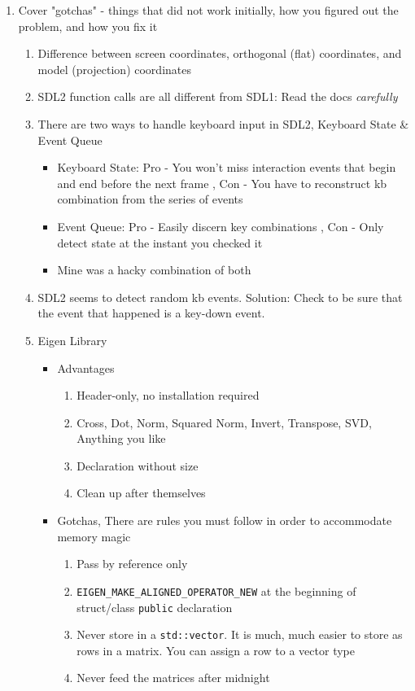 \documentclass{hw_grad}
\begin{document}
\begin{enumerate}
		\item Cover "gotchas" - things that did not work initially, how you figured out the problem, and how you fix it
		\begin{enumerate}
			\item Difference between screen coordinates, orthogonal (flat) coordinates, and model (projection) coordinates
			\item SDL2 function calls are all different from SDL1: Read the docs \textit{carefully}
			\item There are two ways to handle keyboard input in SDL2, Keyboard State \& Event Queue
			\begin{itemize}
				\item Keyboard State: Pro - You won't miss interaction events that begin and end before the next frame , Con - You have to reconstruct kb combination from the series of events
				\item Event Queue: Pro - Easily discern key combinations , Con - Only detect state at the instant you checked it
				\item Mine was a hacky combination of both
			\end{itemize}
			\item SDL2 seems to detect random kb events.  Solution: Check to be sure that the event that happened is a key-down event.
			\item Eigen Library
			\begin{itemize}
				\item Advantages
				\begin{enumerate}
					\item Header-only, no installation required
					\item Cross, Dot, Norm, Squared Norm, Invert, Transpose, SVD, Anything you like
					\item Declaration without size
					\item Clean up after themselves
				\end{enumerate}
				\item Gotchas, There are rules you must follow in order to accommodate memory magic
				\begin{enumerate}
					\item Pass by reference only
					\item {\tt EIGEN\_MAKE\_ALIGNED\_OPERATOR\_NEW} at the beginning of struct/class {\tt public} declaration
					\item Never store in a {\tt std::vector}. \larw It is much, much easier to store as rows in a matrix.  You can assign a row to a vector type
					\item Never feed the matrices after midnight
				\end{enumerate}
			\end{itemize}
		\end{enumerate}
		
	\end{enumerate}
	
	
	
\end{document}
